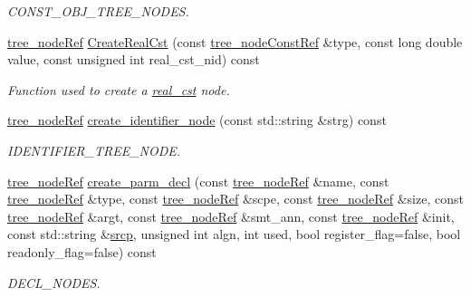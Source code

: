 \begin{DoxyCompactItemize}
\begin{DoxyCompactList}\small\item\em C\+O\+N\+S\+T\+\_\+\+O\+B\+J\+\_\+\+T\+R\+E\+E\+\_\+\+N\+O\+D\+ES. \end{DoxyCompactList}\item 
\hyperlink{tree__node_8hpp_a6ee377554d1c4871ad66a337eaa67fd5}{tree\+\_\+node\+Ref} \hyperlink{classtree__manipulation_ae075d962ddf33404b7dfcd9ff1172194}{Create\+Real\+Cst} (const \hyperlink{tree__node_8hpp_a3cf5d02292c940f3892425a5b5fdec3c}{tree\+\_\+node\+Const\+Ref} \&type, const long double value, const unsigned int real\+\_\+cst\+\_\+nid) const
\begin{DoxyCompactList}\small\item\em Function used to create a \hyperlink{structreal__cst}{real\+\_\+cst} node. \end{DoxyCompactList}\item 
\hyperlink{tree__node_8hpp_a6ee377554d1c4871ad66a337eaa67fd5}{tree\+\_\+node\+Ref} \hyperlink{classtree__manipulation_a5bfe50679122b1dc8fc2730c26ff9f71}{create\+\_\+identifier\+\_\+node} (const std\+::string \&strg) const
\begin{DoxyCompactList}\small\item\em I\+D\+E\+N\+T\+I\+F\+I\+E\+R\+\_\+\+T\+R\+E\+E\+\_\+\+N\+O\+DE. \end{DoxyCompactList}\item 
\hyperlink{tree__node_8hpp_a6ee377554d1c4871ad66a337eaa67fd5}{tree\+\_\+node\+Ref} \hyperlink{classtree__manipulation_afdb65bb06cf5efd3516bf850d06e64b3}{create\+\_\+parm\+\_\+decl} (const \hyperlink{tree__node_8hpp_a6ee377554d1c4871ad66a337eaa67fd5}{tree\+\_\+node\+Ref} \&name, const \hyperlink{tree__node_8hpp_a6ee377554d1c4871ad66a337eaa67fd5}{tree\+\_\+node\+Ref} \&type, const \hyperlink{tree__node_8hpp_a6ee377554d1c4871ad66a337eaa67fd5}{tree\+\_\+node\+Ref} \&scpe, const \hyperlink{tree__node_8hpp_a6ee377554d1c4871ad66a337eaa67fd5}{tree\+\_\+node\+Ref} \&size, const \hyperlink{tree__node_8hpp_a6ee377554d1c4871ad66a337eaa67fd5}{tree\+\_\+node\+Ref} \&argt, const \hyperlink{tree__node_8hpp_a6ee377554d1c4871ad66a337eaa67fd5}{tree\+\_\+node\+Ref} \&smt\+\_\+ann, const \hyperlink{tree__node_8hpp_a6ee377554d1c4871ad66a337eaa67fd5}{tree\+\_\+node\+Ref} \&init, const std\+::string \&\hyperlink{structsrcp}{srcp}, unsigned int algn, int used, bool register\+\_\+flag=false, bool readonly\+\_\+flag=false) const
\begin{DoxyCompactList}\small\item\em D\+E\+C\+L\+\_\+\+N\+O\+D\+ES. \end{DoxyCompactList}\item 

\end{DoxyCompactItemize}
